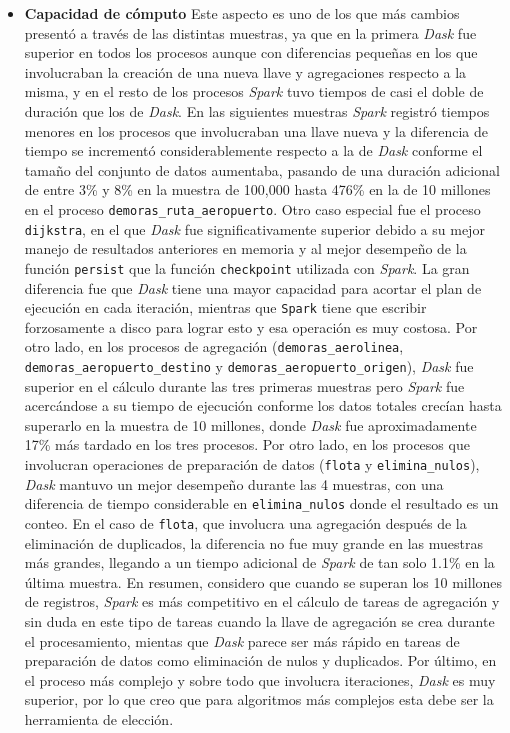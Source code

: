 \begin{itemize}
	\item \textbf{Capacidad de cómputo} Este aspecto es uno de los que más cambios presentó a través de las distintas muestras, ya que en la primera \textit{Dask} fue superior en todos los procesos aunque con diferencias pequeñas en los que involucraban la creación de una nueva llave y agregaciones respecto a la misma, y en el resto de los procesos \textit{Spark} tuvo tiempos de casi el doble de duración que los de \textit{Dask}. En las siguientes muestras \textit{Spark} registró tiempos menores en los procesos que involucraban una llave nueva y la diferencia de tiempo se incrementó considerablemente respecto a la de \textit{Dask} conforme el tamaño del conjunto de datos aumentaba, pasando de una duración adicional de entre 3\% y 8\% en la muestra de 100,000 hasta 476\% en la de 10 millones en el proceso \texttt{demoras\_ruta\_aeropuerto}. Otro caso especial fue el proceso \texttt{dijkstra}, en el que \textit{Dask} fue significativamente superior debido a su mejor manejo de resultados anteriores en memoria y al mejor desempeño de la función \texttt{persist} que la función \texttt{checkpoint} utilizada con \textit{Spark}. La gran diferencia fue que \textit{Dask} tiene una mayor capacidad para acortar el plan de ejecución en cada iteración, mientras que \texttt{Spark} tiene que escribir forzosamente a disco para lograr esto y esa operación es muy costosa. Por otro lado, en los procesos de agregación (\texttt{demoras\_aerolinea}, \texttt{demoras\_aeropuerto\_destino} y \texttt{demoras\_aeropuerto\_origen}), \textit{Dask} fue superior en el cálculo durante las tres primeras muestras pero \textit{Spark} fue acercándose a su tiempo de ejecución conforme los datos totales crecían hasta superarlo en la muestra de 10 millones, donde \textit{Dask} fue aproximadamente 17\% más tardado en los tres procesos. Por otro lado, en los procesos que involucran operaciones de preparación de datos (\texttt{flota} y \texttt{elimina\_nulos}), \textit{Dask} mantuvo un mejor desempeño durante las 4 muestras, con una diferencia de tiempo considerable en \texttt{elimina\_nulos} donde el resultado es un conteo. En el caso de \texttt{flota}, que involucra una agregación después de la eliminación de duplicados, la diferencia no fue muy grande en las muestras más grandes, llegando a un tiempo adicional de \textit{Spark} de tan solo 1.1\% en la última muestra. En resumen, considero que cuando se superan los 10 millones de registros, \textit{Spark} es más competitivo en el cálculo de tareas de agregación y sin duda en este tipo de tareas cuando la llave de agregación se crea durante el procesamiento, mientas que \textit{Dask} parece ser más rápido en tareas de preparación de datos como eliminación de nulos y duplicados. Por último, en el proceso más complejo y sobre todo que involucra iteraciones, \textit{Dask} es muy superior, por lo que creo que para algoritmos más complejos esta debe ser la herramienta de elección.
	

\end{itemize}
